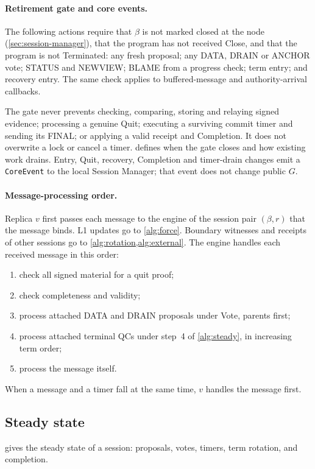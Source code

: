 \documentclass[11pt,a4paper]{article}
\newcommand{\RR}[1]{{\color{rrRed}#1}}
\begin{document}
\paragraph{Retirement gate and core events.}
The following actions require that $\beta$ is not marked closed at the
node (\cref{sec:session-manager}), that the program has not
received Close, and that the program is not
Terminated: any fresh proposal; any DATA, DRAIN or ANCHOR vote; STATUS
and NEWVIEW; BLAME from a progress check; term entry; and recovery entry.
The same check applies to buffered-message and authority-arrival
callbacks.

The gate never prevents checking, comparing, storing and relaying signed
evidence; processing a genuine Quit; executing a surviving commit timer
and sending its FINAL; or applying a valid receipt and Completion. It
does not overwrite a lock or cancel a timer. 
defines when the gate closes and how existing work drains. Entry, Quit,
recovery, Completion and timer-drain changes emit a \texttt{CoreEvent} to
the local Session Manager; that event does not change public $G$.

\paragraph{Message-processing order.}\leavevmode
\RR{Replica $v$ first passes each message to the engine of the session
pair $(\beta,r)$ that the message binds. L1 updates go to \cref{alg:force}. Boundary witnesses and receipts of
other sessions go to \cref{alg:rotation,alg:external}.} The engine handles each received
message in this order:
\begin{enumerate}[label=(\arabic*)]
\item check all signed material for a quit proof;
\item check completeness and validity;
\item process attached DATA \RR{and DRAIN} proposals under Vote, parents
first;
\item process attached terminal QCs under step~4 of \cref{alg:steady},
in increasing term order;
\item process the message itself.
\end{enumerate}
When a message and a timer fall at the same time, $v$ handles the
message first.

\subsection{Steady state}
\label{sec:steady}
 gives the steady state of a session: proposals, votes,
timers, term rotation, and completion.
\end{document}
